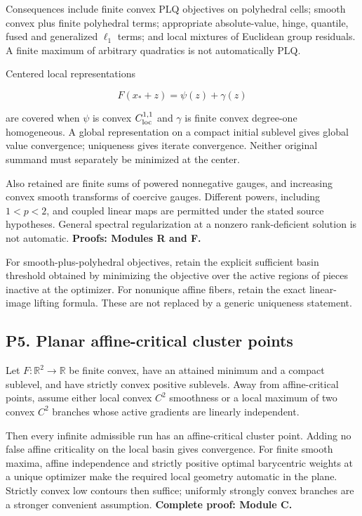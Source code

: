 Consequences include finite convex PLQ objectives on polyhedral cells; smooth convex plus finite polyhedral terms; appropriate absolute-value, hinge, quantile, fused and generalized \(\ell_1\) terms; and local mixtures of Euclidean group residuals. A finite maximum of arbitrary quadratics is not automatically PLQ.

Centered local representations

\[F(x_*+z)=\psi(z)+\gamma(z)\]

are covered when \(\psi\) is convex \(C^{1,1}_{\rm loc}\) and \(\gamma\) is finite convex degree-one homogeneous. A global representation on a compact initial sublevel gives global value convergence; uniqueness gives iterate convergence. Neither original summand must separately be minimized at the center.

Also retained are finite sums of powered nonnegative gauges, and increasing convex smooth transforms of coercive gauges. Different powers, including \(1<p<2\), and coupled linear maps are permitted under the stated source hypotheses. General spectral regularization at a nonzero rank-deficient solution is not automatic. \textbf{Proofs: Modules R and F.}

For smooth-plus-polyhedral objectives, retain the explicit sufficient basin threshold obtained by minimizing the objective over the active regions of pieces inactive at the optimizer. For nonunique affine fibers, retain the exact linear-image lifting formula. These are not replaced by a generic uniqueness statement.

\subsection{P5. Planar affine-critical cluster points}\label{p5.-planar-affine-critical-cluster-points}

Let \(F:\mathbb R^2\to\mathbb R\) be finite convex, have an attained minimum and a compact sublevel, and have strictly convex positive sublevels. Away from affine-critical points, assume either local convex \(C^2\) smoothness or a local maximum of two convex \(C^2\) branches whose active gradients are linearly independent.

Then every infinite admissible run has an affine-critical cluster point. Adding no false affine criticality on the local basin gives convergence. For finite smooth maxima, affine independence and strictly positive optimal barycentric weights at a unique optimizer make the required local geometry automatic in the plane. Strictly convex low contours then suffice; uniformly strongly convex branches are a stronger convenient assumption. \textbf{Complete proof: Module C.}

